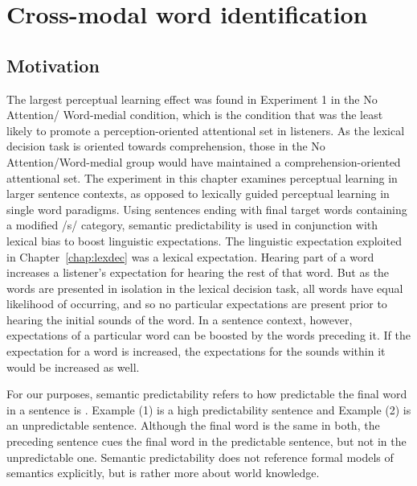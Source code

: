 
\chapter{Cross-modal word identification}
\label{chap:sent}


\section{Motivation}

The largest perceptual learning effect was found in Experiment 1 in the No Attention/ Word-medial condition, which is the condition that was the least likely to promote a perception-oriented attentional set in listeners.
As the lexical decision task is oriented towards comprehension, those in the No Attention/Word-medial group would have maintained a comprehension-oriented attentional set. 
The experiment in this chapter examines perceptual learning in larger sentence contexts, as opposed to lexically guided perceptual learning in single word paradigms.
Using sentences ending with final target words containing a modified /s/ category, semantic predictability is used in conjunction with lexical bias to boost linguistic expectations.
The linguistic expectation exploited in Chapter~\ref{chap:lexdec} was a lexical expectation.
Hearing part of a word increases a listener's expectation for hearing the rest of that word.
But as the words are presented in isolation in the lexical decision task, all words have equal likelihood of occurring, and so no particular expectations are present prior to hearing the initial sounds of the word.
In a sentence context, however, expectations of a particular word can be boosted by the words preceding it.
If the expectation for a word is increased, the expectations for the sounds within it would be increased as well.


For our purposes, semantic predictability refers to how predictable the final word in a sentence is \citep{Kalikow1977}.
Example (1) is a high predictability sentence and Example (2) is an unpredictable sentence.
Although the final word is the same in both, the preceding sentence cues the final word in the predictable sentence, but not in the unpredictable one.
Semantic predictability does not reference formal models of semantics explicitly, but is rather more about world knowledge.

